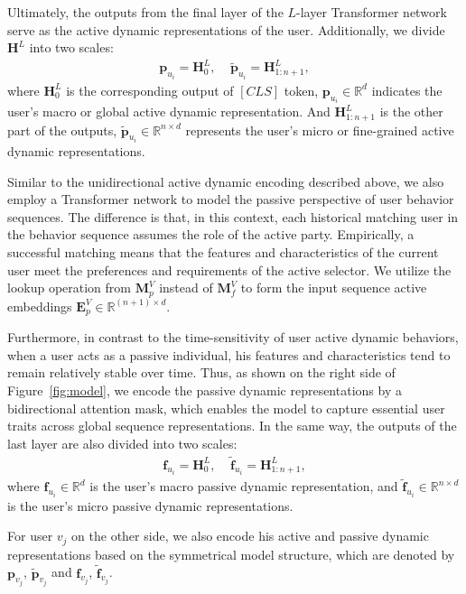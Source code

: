 Ultimately, the outputs from the final layer of the $L$-layer Transformer network serve as the active dynamic representations of the user. Additionally, we divide $\bm{H}^{L}$ into two scales:
\begin{align}
    \bm{p}_{u_i} = \bm{H}^{L}_{0}, \ \ \ \ \
    \widetilde{\bm{p}}_{u_i} = \bm{H}^{L}_{1:n+1},
\end{align}
where $\bm{H}^{L}_{0}$ is the corresponding output of $[CLS]$ token, $\bm{p}_{u_i} \in \mathbb{R}^{d}$ indicates the user's macro or global active dynamic representation. And $\bm{H}^{L}_{1:n+1}$ is the other part of the outputs, $\widetilde{\bm{p}}_{u_i} \in \mathbb{R}^{n \times d}$ represents the user's micro or fine-grained active dynamic representations.

Similar to the unidirectional active dynamic encoding described above, we also employ a Transformer network to model the passive perspective of user behavior sequences.
The difference is that, in this context, each historical matching user in the behavior sequence assumes the role of the active party.
Empirically, a successful matching means that the features and characteristics of the current user meet the preferences and requirements of the active selector.
We utilize the lookup operation from $\bm{M}^{V}_{p}$ instead of $\bm{M}^{V}_{f}$ to form the input sequence active embeddings $\bm{E}^{V}_{p} \in \mathbb{R}^{(n+1) \times d}$.

Furthermore, in contrast to the time-sensitivity of user active dynamic behaviors, when a user acts as a passive individual, his features and characteristics tend to remain relatively stable over time.
Thus, as shown on the right side of Figure~\ref{fig:model}, we encode the passive dynamic representations by a bidirectional attention mask, which enables the model to capture essential user traits across global sequence representations. 
In the same way, the outputs of the last layer are also divided into two scales:
\begin{align}
    \bm{f}_{u_i} = \bm{H}^{L}_{0}, \ \ \ \ \
    \widetilde{\bm{f}}_{u_i} = \bm{H}^{L}_{1:n+1},
\end{align}
where $\bm{f}_{u_i} \in \mathbb{R}^{d}$ is the user's macro passive dynamic representation, and $\widetilde{\bm{f}}_{u_i} \in \mathbb{R}^{n \times d}$ is the user's micro passive dynamic representations.

For user $v_{j}$ on the other side, we also encode his active and passive dynamic representations based on the symmetrical model structure, which are denoted by $\bm{p}_{v_j}$, $\widetilde{\bm{p}}_{v_j}$ and $\bm{f}_{v_j}$, $\widetilde{\bm{f}}_{v_j}$.

